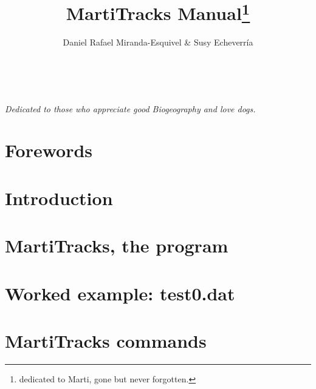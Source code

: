 \documentclass[nols]{tufte-book}
\title{{M}arti{T}racks Manual\thanks{dedicated to Marti, gone but never forgotten.}}
\author[Daniel Rafael Miranda-Esquivel \& Susy Echeverr\'ia]{Daniel Rafael Miranda-Esquivel \& Susy Echeverr\'ia}
\begin{document}



% 
% 

\frontmatter



%
\newpage\thispagestyle{empty}
\vfill
{}



\maketitle





\tableofcontents

\listoffigures

\listoftables

\cleardoublepage
~\vfill
\begin{doublespace}
\noindent\fontsize{18}{22}\selectfont\itshape
\nohyphenation
Dedicated to those who appreciate good Biogeography and love dogs.
\end{doublespace}

\chapter{Forewords}



\mainmatter


\chapter{Introduction}



\chapter{MartiTracks, the program}

  

\chapter{Worked example: test0.dat}



\chapter{MartiTracks commands}




\backmatter




\printindex
\end{document}

